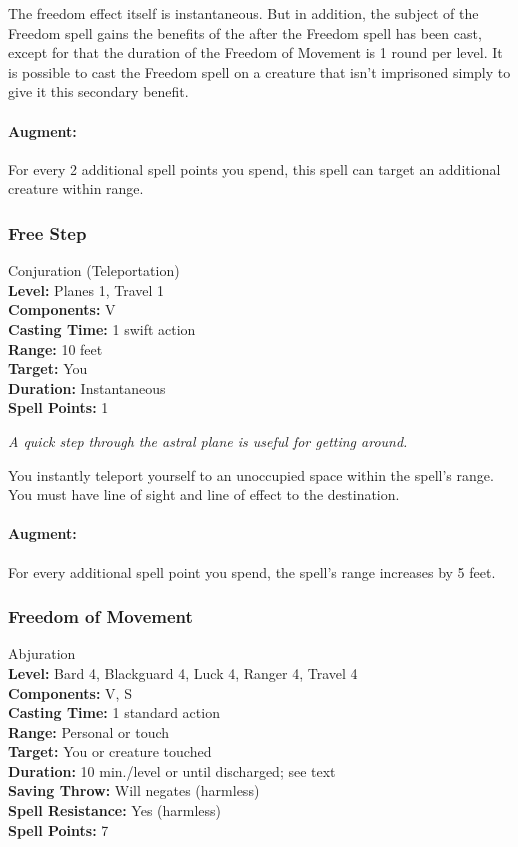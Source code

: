 The freedom effect itself is instantaneous. 
But in addition, the subject of the Freedom spell gains the benefits of the  after the Freedom spell has been cast,
except for that the duration of the Freedom of Movement is 1 round per level.
It is possible to cast the Freedom spell on a creature that isn't imprisoned simply to give it this secondary benefit.

\paragraph{Augment:} For every 2 additional spell points you spend, this spell can target an additional creature within range.

\subsubsection{Free Step}
\label{Spell:FreeStep}
Conjuration (Teleportation)
\\ \textbf{Level:} Planes 1, Travel 1
\\ \textbf{Components:} V
\\ \textbf{Casting Time:} 1 swift action
\\ \textbf{Range:} 10 feet
\\ \textbf{Target:} You
\\ \textbf{Duration:} Instantaneous
\\ \textbf{Spell Points:} 1

\emph{A quick step through the astral plane is useful for getting around.}

You instantly teleport yourself to an unoccupied space within the spell's range.
You must have line of sight and line of effect to the destination.

\paragraph{Augment:} For every additional spell point you spend, the spell's range increases by 5 feet.

\subsubsection{Freedom of Movement}
\label{Spell:FreedomOfMovement}
Abjuration
\\ \textbf{Level:} Bard 4, Blackguard 4, Luck 4, Ranger 4, Travel 4
\\ \textbf{Components:} V, S
\\ \textbf{Casting Time:} 1 standard action
\\ \textbf{Range:} Personal or touch
\\ \textbf{Target:} You or creature touched
\\ \textbf{Duration:} 10 min./level or until discharged; see text
\\ \textbf{Saving Throw:} Will negates (harmless)
\\ \textbf{Spell Resistance:} Yes (harmless)
\\ \textbf{Spell Points:} 7

